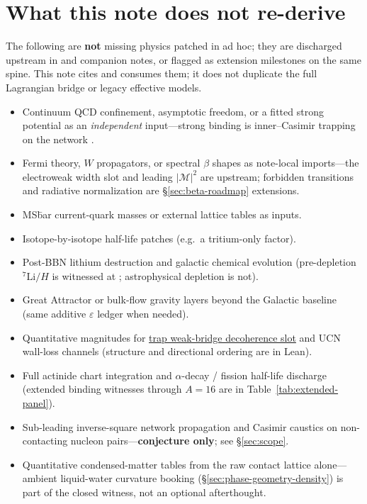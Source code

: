 \documentclass[11pt,notitlepage]{amsart}
\begin{document}
\section{What this note does not re-derive}
\label{sec:not-claimed}

The following are \textbf{not} missing physics patched in ad hoc; they are discharged
upstream in \cite{hqiv-tuft-sm-lagrangian-paper} and companion notes, or flagged as
extension milestones on the same spine. This note cites and consumes them; it does not
duplicate the full Lagrangian bridge or legacy effective models.

\begin{itemize}[leftmargin=2em]
\item Continuum QCD confinement, asymptotic freedom, or a fitted strong potential as an
  \emph{independent} input---strong binding is inner--Casimir trapping on the network
  \cite{hqiv-gluon-curvature-note,hqiv-tuft-sm-lagrangian-paper}.
\item Fermi theory, $W$ propagators, or spectral $\beta$ shapes as note-local imports---the
  electroweak width slot and leading $|\mathcal{M}|^2$ are upstream; forbidden transitions
  and radiative normalization are \S\ref{sec:beta-roadmap} extensions.
\item MS\=bar current-quark masses or external lattice tables as inputs.
\item Isotope-by-isotope half-life patches (e.g.\ a tritium-only factor).
\item Post-BBN lithium destruction and galactic chemical evolution (pre-depletion
  $^7\mathrm{Li}/H$ is witnessed at \cite{hqiv-bbn-paper}; astrophysical depletion is not).
\item Great Attractor or bulk-flow gravity layers beyond the Galactic baseline
  (same additive $\varepsilon$ ledger when needed).
\item Quantitative magnitudes for \hyperref[lean:neutron-lifetime-method]{trap weak-bridge decoherence slot} and UCN
  wall-loss channels (structure and directional ordering are in Lean).
\item Full actinide chart integration and $\alpha$-decay / fission half-life discharge
  (extended binding witnesses through $A=16$ are in Table~\ref{tab:extended-panel}).
\item Sub-leading inverse-square network propagation and Casimir caustics on
  non-contacting nucleon pairs---\textbf{conjecture only}; see \S\ref{sec:scope}.
\item Quantitative condensed-matter tables from the raw contact lattice alone---ambient
  liquid-water curvature booking (\S\ref{sec:phase-geometry-density}) is part of the
  closed witness, not an optional afterthought.
\end{itemize}
\end{document}
